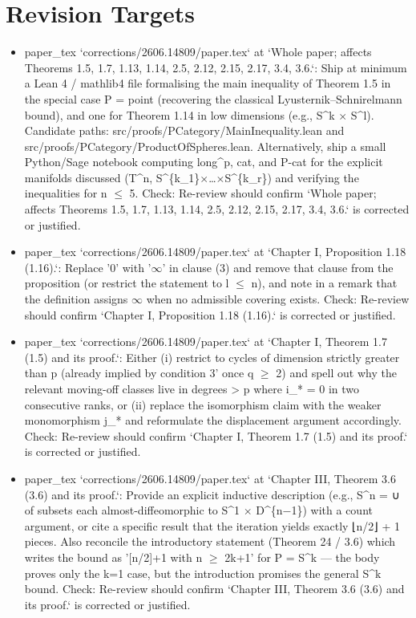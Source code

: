 \documentclass[11pt]{article}
\begin{document}
\section*{Revision Targets}
\begin{itemize}[leftmargin=*]
  \item [open] paper\_tex `corrections/2606.14809/paper.tex` at `Whole paper; affects Theorems 1.5, 1.7, 1.13, 1.14, 2.5, 2.12, 2.15, 2.17, 3.4, 3.6.`: Ship at minimum a Lean 4 / mathlib4 file formalising the main inequality of Theorem 1.5 in the special case P = point (recovering the classical Lyusternik--Schnirelmann bound), and one for Theorem 1.14 in low dimensions (e.g., S\^{}k \ensuremath{\times} S\^{}l). Candidate paths: src/proofs/PCategory/MainInequality.lean and src/proofs/PCategory/ProductOfSpheres.lean. Alternatively, ship a small Python/Sage notebook computing long\^{}p, cat, and P-cat for the explicit manifolds discussed (T\^{}n, S\^{}\{k\_1\}\ensuremath{\times}…\ensuremath{\times}S\^{}\{k\_r\}) and verifying the inequalities for n \ensuremath{\le} 5. Check: Re-review should confirm `Whole paper; affects Theorems 1.5, 1.7, 1.13, 1.14, 2.5, 2.12, 2.15, 2.17, 3.4, 3.6.` is corrected or justified.
  \item [open] paper\_tex `corrections/2606.14809/paper.tex` at `Chapter I, Proposition 1.18 (1.16).`: Replace '0' with '\ensuremath{\infty}' in clause (3) and remove that clause from the proposition (or restrict the statement to l \ensuremath{\le} n), and note in a remark that the definition assigns \ensuremath{\infty} when no admissible covering exists. Check: Re-review should confirm `Chapter I, Proposition 1.18 (1.16).` is corrected or justified.
  \item [open] paper\_tex `corrections/2606.14809/paper.tex` at `Chapter I, Theorem 1.7 (1.5) and its proof.`: Either (i) restrict to cycles of dimension strictly greater than p (already implied by condition 3' once q \ensuremath{\ge} 2) and spell out why the relevant moving-off classes live in degrees > p where i\_* = 0 in two consecutive ranks, or (ii) replace the isomorphism claim with the weaker monomorphism j\_* and reformulate the displacement argument accordingly. Check: Re-review should confirm `Chapter I, Theorem 1.7 (1.5) and its proof.` is corrected or justified.
  \item [open] paper\_tex `corrections/2606.14809/paper.tex` at `Chapter III, Theorem 3.6 (3.6) and its proof.`: Provide an explicit inductive description (e.g., S\^{}n = ∪ of subsets each almost-diffeomorphic to S\^{}1 \ensuremath{\times} D\^{}\{n\ensuremath{-}1\}) with a count argument, or cite a specific result that the iteration yields exactly ⌊n/2⌋ + 1 pieces. Also reconcile the introductory statement (Theorem 24 / 3.6) which writes the bound as '[n/2]+1 with n \ensuremath{\ge} 2k+1' for P = S\^{}k --- the body proves only the k=1 case, but the introduction promises the general S\^{}k bound. Check: Re-review should confirm `Chapter III, Theorem 3.6 (3.6) and its proof.` is corrected or justified.

\end{itemize}
\end{document}
